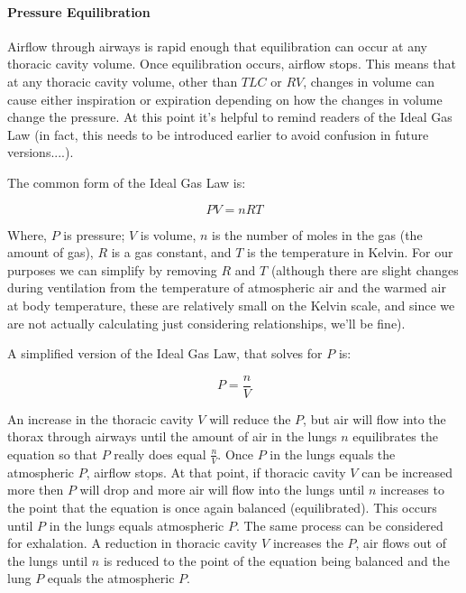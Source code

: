 \paragraph{Pressure Equilibration} Airflow through airways is rapid enough that equilibration can occur at any thoracic cavity volume. Once equilibration occurs, airflow stops. This means that at any thoracic cavity volume, other than $TLC$ or $RV$, changes in volume can cause either inspiration or expiration depending on how the changes in volume change the pressure. At this point it's helpful to remind readers of the Ideal Gas Law (in fact, this needs to be introduced earlier to avoid confusion in future versions....). 

The common form of the Ideal Gas Law is: 

\begin{equation}
    PV = nRT
    \label{ideal_gas}
\end{equation}

Where, $P$ is pressure; $V$ is volume, $n$ is the number of moles in the gas (the amount of gas), $R$ is a gas constant, and $T$ is the temperature in Kelvin. For our purposes we can simplify by removing $R$ and $T$ (although there are slight changes during ventilation from the temperature of atmospheric air and the warmed air at body temperature, these are relatively small on the Kelvin scale, and since we are not actually calculating just considering relationships, we'll be fine).

A simplified version of the Ideal Gas Law, that solves for $P$ is:

\begin{equation}
    P = \frac{n}{V}
\end{equation}

An increase in the thoracic cavity $V$ will reduce the $P$, but air will flow into the thorax through airways until the amount of air in the lungs $n$ equilibrates the equation so that $P$ really does equal $\frac{n}{V}$. Once $P$ in the lungs equals the atmospheric $P$, airflow stops. At that point, if thoracic cavity $V$ can be increased more then $P$ will drop and more air will flow into the lungs until $n$ increases to the point that the equation is once again balanced (equilibrated). This occurs until $P$ in the lungs equals atmospheric $P$. 
The same process can be considered for exhalation. A reduction in thoracic cavity $V$ increases the $P$, air flows out of the lungs until $n$ is reduced to the point of the equation being balanced and the lung $P$ equals the atmospheric $P$. 

